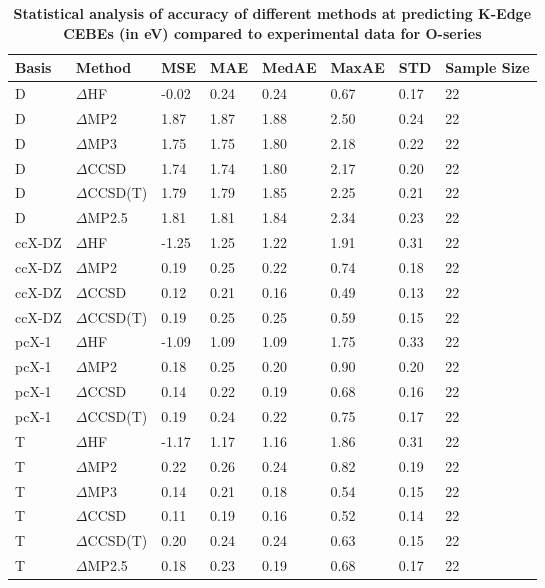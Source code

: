 \begin{table}
  \caption{\textbf{Statistical analysis of accuracy of different methods at predicting K-Edge CEBEs (in eV) compared to experimental data for O-series}}
  \label{tbl:method-summary-o}
  \begin{tabular}{l l l l l l l l }
    \toprule
    \textbf{Basis} & \textbf{Method} & \textbf{MSE} & \textbf{MAE} & \textbf{MedAE} & \textbf{MaxAE} & \textbf{STD} & \textbf{Sample Size} \\ 
    \midrule
    D & $\Delta$HF & -0.02 & 0.24 & 0.24 & 0.67 & 0.17 & 22 \\ 
    D & $\Delta$MP2 & 1.87 & 1.87 & 1.88 & 2.50 & 0.24 & 22 \\ 
    D & $\Delta$MP3 & 1.75 & 1.75 & 1.80 & 2.18 & 0.22 & 22 \\ 
    D & $\Delta$CCSD & 1.74 & 1.74 & 1.80 & 2.17 & 0.20 & 22 \\ 
    D & $\Delta$CCSD(T) & 1.79 & 1.79 & 1.85 & 2.25 & 0.21 & 22 \\ 
    D & $\Delta$MP2.5 & 1.81 & 1.81 & 1.84 & 2.34 & 0.23 & 22 \\ 
    ccX-DZ & $\Delta$HF & -1.25 & 1.25 & 1.22 & 1.91 & 0.31 & 22 \\ 
    ccX-DZ & $\Delta$MP2 & 0.19 & 0.25 & 0.22 & 0.74 & 0.18 & 22 \\ 
    ccX-DZ & $\Delta$CCSD & 0.12 & 0.21 & 0.16 & 0.49 & 0.13 & 22 \\ 
    ccX-DZ & $\Delta$CCSD(T) & 0.19 & 0.25 & 0.25 & 0.59 & 0.15 & 22 \\ 
    pcX-1 & $\Delta$HF & -1.09 & 1.09 & 1.09 & 1.75 & 0.33 & 22 \\ 
    pcX-1 & $\Delta$MP2 & 0.18 & 0.25 & 0.20 & 0.90 & 0.20 & 22 \\ 
    pcX-1 & $\Delta$CCSD & 0.14 & 0.22 & 0.19 & 0.68 & 0.16 & 22 \\ 
    pcX-1 & $\Delta$CCSD(T) & 0.19 & 0.24 & 0.22 & 0.75 & 0.17 & 22 \\ 
    T & $\Delta$HF & -1.17 & 1.17 & 1.16 & 1.86 & 0.31 & 22 \\ 
    T & $\Delta$MP2 & 0.22 & 0.26 & 0.24 & 0.82 & 0.19 & 22 \\ 
    T & $\Delta$MP3 & 0.14 & 0.21 & 0.18 & 0.54 & 0.15 & 22 \\ 
    T & $\Delta$CCSD & 0.11 & 0.19 & 0.16 & 0.52 & 0.14 & 22 \\ 
    T & $\Delta$CCSD(T) & 0.20 & 0.24 & 0.24 & 0.63 & 0.15 & 22 \\ 
    T & $\Delta$MP2.5 & 0.18 & 0.23 & 0.19 & 0.68 & 0.17 & 22 \\ 

\end{tabular}
\end{table}
